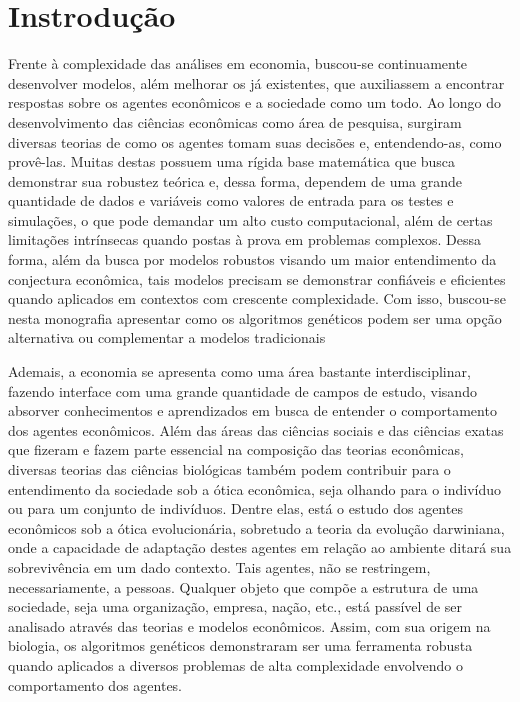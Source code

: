 \chapter{Instrodução}

Frente à complexidade das análises em economia, buscou-se continuamente desenvolver modelos, além melhorar os já existentes, que auxiliassem a encontrar respostas sobre os agentes econômicos e a sociedade como um todo. Ao longo do desenvolvimento das ciências econômicas como área de pesquisa, surgiram diversas teorias de como os agentes tomam suas decisões e, entendendo-as, como provê-las. Muitas destas possuem uma rígida base matemática que busca demonstrar sua robustez teórica e, dessa forma, dependem de uma grande quantidade de dados e variáveis como valores de entrada para os testes e simulações, o que pode demandar um alto custo computacional, além de certas limitações intrínsecas quando postas à prova em problemas complexos. Dessa forma, além da busca por modelos robustos visando um maior entendimento da conjectura econômica, tais modelos precisam se demonstrar confiáveis e eficientes quando aplicados em contextos com crescente complexidade. Com isso, buscou-se nesta monografia apresentar como os algoritmos genéticos podem ser uma opção alternativa ou complementar a modelos tradicionais 

Ademais, a economia se apresenta como uma área bastante interdisciplinar, fazendo interface com uma grande quantidade de campos de estudo, visando absorver conhecimentos e aprendizados em busca de entender o comportamento dos agentes econômicos. Além das áreas das ciências sociais e das ciências exatas que fizeram e fazem parte essencial na composição das teorias econômicas, diversas teorias das ciências biológicas também podem contribuir para o entendimento da sociedade sob a ótica econômica, seja olhando para o indivíduo ou para um conjunto de indivíduos. Dentre elas, está o estudo dos agentes econômicos sob a ótica evolucionária, sobretudo a teoria da evolução darwiniana, onde a capacidade de adaptação destes agentes em relação ao ambiente ditará sua sobrevivência em um dado contexto. Tais agentes, não se restringem, necessariamente, a pessoas. Qualquer objeto que compõe a estrutura de uma sociedade, seja uma organização, empresa, nação, etc., está passível de ser analisado através das teorias e modelos econômicos. Assim, com sua origem na biologia, os algoritmos genéticos demonstraram ser uma ferramenta robusta quando aplicados a diversos problemas de alta complexidade envolvendo o comportamento dos agentes.

